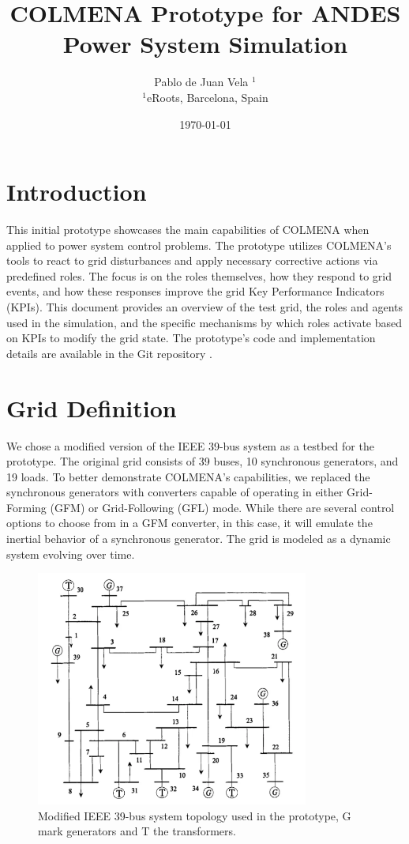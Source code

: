 \documentclass{article}
\title{COLMENA Prototype for ANDES Power System Simulation}
\author{Pablo de Juan Vela $^{1}$ \\
        \small $^{1}$eRoots, Barcelona, Spain \\
}
\date{\today}
\begin{document}
\maketitle

\section{Introduction}

This initial prototype showcases the main capabilities of COLMENA when applied to power system control problems. The prototype utilizes COLMENA's tools to react to grid disturbances and apply necessary corrective actions via predefined roles. The focus is on the roles themselves, how they respond to grid events, and how these responses improve the grid Key Performance Indicators (KPIs). This document provides an overview of the test grid, the roles and agents used in the simulation, and the specific mechanisms by which roles activate based on KPIs to modify the grid state. The prototype's code and implementation details are available in the Git repository \cite{git:eroots}.

\section{Grid Definition}

We chose a modified version of the IEEE 39-bus system \cite{grids:ieee39} as a testbed for the prototype. The original grid consists of 39 buses, 10 synchronous generators, and 19 loads. To better demonstrate COLMENA's capabilities, we replaced the synchronous generators with converters capable of operating in either Grid-Forming (GFM) or Grid-Following (GFL) mode. While there are several control options to choose from in a GFM converter, in this case, it will emulate the inertial behavior of a synchronous generator. The grid is modeled as a dynamic system evolving over time.
\begin{figure}[h]
    \centering
    \begin{center}
        \includegraphics[width=0.8\textwidth]{plots/IEEE39withtrafo.png}
    \end{center}
    \caption{Modified IEEE 39-bus system topology used in the prototype, G mark generators and T the transformers.}
    \label{fig:ieee39_topology}
\end{figure}
\end{document}
